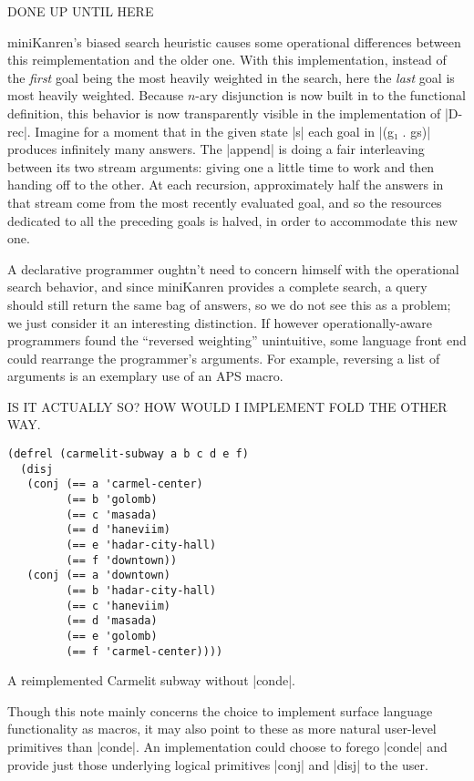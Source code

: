 \documentclass[sigplan,screen,draft,anonymous,review,natbib=false]{acmart}
\begin{document}
DONE UP UNTIL HERE

miniKanren's biased search heuristic causes some operational
differences between this reimplementation and the older one. With this
implementation, instead of the \emph{first} goal being the most
heavily weighted in the search, here the \emph{last} goal is most
heavily weighted. Because $n$-ary disjunction is now built in to the
functional definition, this behavior is now transparently visible in
the implementation of \rackinline|D-rec|. Imagine for a moment that in
the given state \rackinline|s| each goal in \rackinline|(g₁ . gs)|
produces infinitely many answers. The \rackinline|append| is doing a
fair interleaving between its two stream arguments: giving one a
little time to work and then handing off to the other. At each
recursion, approximately half the answers in that stream come from the
most recently evaluated goal, and so the resources dedicated to all
the preceding goals is halved, in order to accommodate this new one.

A declarative programmer oughtn't need to concern himself with the
operational search behavior, and since miniKanren provides a complete
search, a query should still return the same bag of answers, so we do
not see this as a problem; we just consider it an interesting
distinction. If however operationally-aware programmers found the
\enquote{reversed weighting} unintuitive, some language front end
could rearrange the programmer's arguments. For example, reversing a
list of arguments is an exemplary use of an APS macro.

IS IT ACTUALLY SO? HOW WOULD I IMPLEMENT FOLD THE OTHER WAY.

\begin{listing}
  \begin{verbatim}
(defrel (carmelit-subway a b c d e f)
  (disj
   (conj (== a 'carmel-center)
         (== b 'golomb)
         (== c 'masada)
         (== d 'haneviim)
         (== e 'hadar-city-hall)
         (== f 'downtown))
   (conj (== a 'downtown)
         (== b 'hadar-city-hall)
         (== c 'haneviim)
         (== d 'masada)
         (== e 'golomb)
         (== f 'carmel-center))))
  \end{verbatim}
  \caption{A reimplemented Carmelit subway without \rackinline|conde|.}
  \label{mnt:new-carmelit}
\end{listing}

Though this note mainly concerns the choice to implement surface
language functionality as macros, it may also point to these as more
natural user-level primitives than \rackinline|conde|. An
implementation could choose to forego \rackinline|conde| and provide
just those underlying logical primitives \rackinline|conj| and
\rackinline|disj| to the user.
\end{document}
